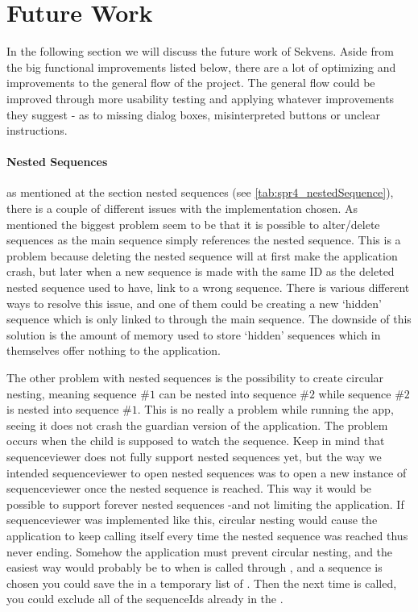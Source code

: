 \section{Future Work}\label{sec:future_work}
In the following section we will discuss the future work of Sekvens. Aside from the big functional improvements listed below, there are a lot of optimizing and improvements to the general flow of the project. The general flow could be improved through more usability testing and applying whatever improvements they suggest - as to missing dialog boxes, misinterpreted buttons or unclear instructions.

\paragraph{Nested Sequences} as mentioned at the section nested sequences (see \ref{tab:spr4_nestedSequence}), there is a couple of different issues with the implementation chosen. As mentioned the biggest problem seem to be that it is possible to alter/delete sequences as the main sequence simply references the nested sequence. This is a problem because deleting the nested sequence will at first make the application crash, but later when a new sequence is made with the same ID as the deleted nested sequence used to have, link to a wrong sequence. There is various different ways to resolve this issue, and one of them could be creating a new `hidden' sequence which is only linked to through the main sequence. The downside of this solution is the amount of memory used to store `hidden' sequences which in themselves offer nothing to the application.

The other problem with nested sequences is the possibility to create circular nesting, meaning sequence $\#1$ can be nested into sequence $\#2$ while sequence $\#2$ is nested into sequence $\#1$. This is no really a problem while running the app, seeing it does not crash the guardian version of the application. The problem occurs when the child is supposed to watch the sequence. Keep in mind that sequenceviewer does not fully support nested sequences yet, but the way we intended sequenceviewer to open nested sequences was to open a new instance of sequenceviewer once the nested sequence is reached. This way it would be possible to support forever nested sequences -and not limiting the application. If sequenceviewer was implemented like this, circular nesting would cause the application to keep calling itself every time the nested sequence was reached thus never ending. Somehow the application must prevent circular nesting, and the easiest way would probably be to when  is called through , and a sequence is chosen you could save the  in a temporary list of . Then the next time  is called, you could exclude all of the sequenceIds already in the .

